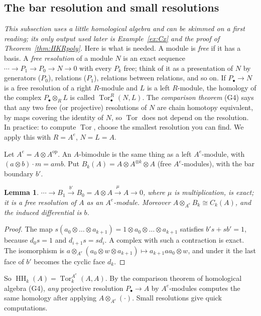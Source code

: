 \documentclass[11pt,oneside,reqno]{article}
\DeclareMathOperator{\HH}{HH}
\DeclareMathOperator{\Tor}{Tor}
\theoremstyle{plain}
\newtheorem{lemma}[theorem]{Lemma}
\theoremstyle{definition}
\theoremstyle{remark}
\begin{document}
\subsection{The bar resolution and small resolutions}\label{subsec:barres}
\emph{This subsection uses a little homological algebra and can be skimmed on a
first reading; its only output used later is Example~\ref{ex:Cx} and the proof of
Theorem~\ref{thm:HKRpoly}.} Here is what is needed. A module is \emph{free} if it has
a basis. A \emph{free resolution} of a module \(N\) is an exact sequence
\(\cdots\to P_1\to P_0\to N\to0\) with every \(P_k\) free; think of it as a presentation of
\(N\) by generators (\(P_0\)), relations (\(P_1\)), relations between relations, and so on.
If \(P_\bullet\to N\) is a free resolution of a right \(R\)-module and \(L\) is a left
\(R\)-module, the homology of the complex \(P_\bullet\otimes_RL\) is called
\(\Tor^R_\bullet(N,L)\). The \emph{comparison theorem} (G4) says that any two free (or
projective) resolutions of \(N\) are chain homotopy equivalent, by maps covering the
identity of \(N\), so \(\Tor\) does not depend on the resolution. In practice: to
compute \(\Tor\), choose the smallest resolution you can find. We apply this with
\(R=A^e\), \(N=L=A\).

Let \(A^e=A\otimes A^{\mathrm{op}}\). An \(A\)-bimodule is the same thing as a
left \(A^e\)-module, with \((a\otimes b)\cdot m=amb\). Put
\(B_k(A)=A\otimes A^{\otimes k}\otimes A\) (free \(A^e\)-modules), with the
bar boundary \(b'\).

\begin{lemma}\label{lem:barres}
\(\cdots\to B_1\xrightarrow{b'}B_0=A\otimes A\xrightarrow{\mu}A\to0\),
where \(\mu\) is multiplication, is exact; it is a free resolution of \(A\)
as an \(A^e\)-module. Moreover \(A\otimes_{A^e}B_k\cong C_k(A)\), and the
induced differential is \(b\).
\end{lemma}

\begin{proof}
The map \(s(a_0\otimes\dots\otimes a_{k+1})=1\otimes a_0\otimes\dots\otimes
a_{k+1}\) satisfies \(b's+sb'=1\), because \(d_0s=1\) and \(d_{i+1}s=sd_i\).
A complex with such a contraction is exact. The isomorphism is
\(a\otimes_{A^e}(a_0\otimes w\otimes a_{k+1})\mapsto a_{k+1}aa_0\otimes w\),
and under it the last face of \(b'\) becomes the cyclic face \(d_k\).
\end{proof}

So \(\HH_k(A)=\Tor_k^{A^e}(A,A)\). By the comparison theorem of homological
algebra (G4), \emph{any} projective resolution \(P_\bullet\to A\) by
\(A^e\)-modules computes the same homology after applying
\(A\otimes_{A^e}(\cdot)\). Small resolutions give quick computations.
\end{document}
